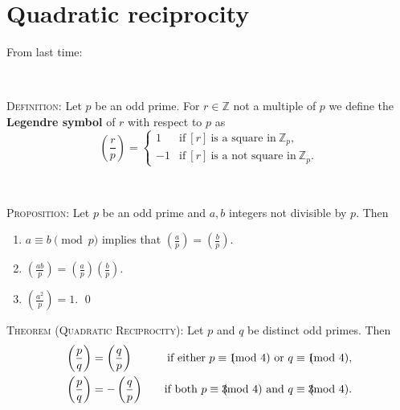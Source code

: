 \documentclass[12pt]{amsart}
\newcommand{\Z}{\mathbb{Z}}
\newcommand{\showsol}[1]{\def\displaysol{#1}}
\begin{document}
\showsol{0}
	
	\thispagestyle{empty}
	
	\section*{Quadratic reciprocity}
	
	
\begin{framed} \noindent From last time:

\

\noindent\textsc{Definition:} Let $p$ be an odd prime. For $r\in \Z$ not a multiple of $p$ we define the \textbf{Legendre symbol}  of $r$ with respect to $p$ as 
\[ \left( \frac{r}{p} \right) = \begin{cases} 1 & \text{if} \ [r] \ \text{is a square in} \ \Z_p, \\ -1 & \text{if} \ [r] \ \text{is a not square in} \ \Z_p. \end{cases}\]

\

\noindent \textsc{Proposition:} Let $p$ be an odd prime and $a,b$ integers not divisible by $p$. Then
\begin{enumerate}
\item $\displaystyle a\equiv b \pmod{p}$ implies that $\displaystyle \left(\frac{a}{p}\right) = \left(\frac{b}{p}\right)$.

\vspace{2mm}

\item $\displaystyle\left(\frac{ab}{p}\right) = \left(\frac{a}{p}\right) \left(\frac{b}{p}\right)$.

\vspace{2mm}

\item $\displaystyle\left(\frac{a^2}{p}\right) = 1$. \hfill \qed
\end{enumerate}


\noindent \hrulefill

\noindent \textsc{Theorem (Quadratic Reciprocity):} Let $p$ and $q$ be distinct odd primes. Then
\[\begin{aligned} &\left( \frac{p}{q} \right) = \left( \frac{q}{p} \right) \quad &\text{if either} \ p\equiv 1\hspace{-3mm}\pmod 4 \ \text{or} \ q \equiv 1\hspace{-3mm}\pmod 4, \\
&\left( \frac{p}{q} \right) =- \left( \frac{q}{p} \right) \quad &\text{if both} \ p\equiv 3\hspace{-3mm}\pmod 4 \ \text{and} \ q\equiv 3\hspace{-3mm}\pmod 4. \end{aligned} \]



\end{framed}
\end{document}
